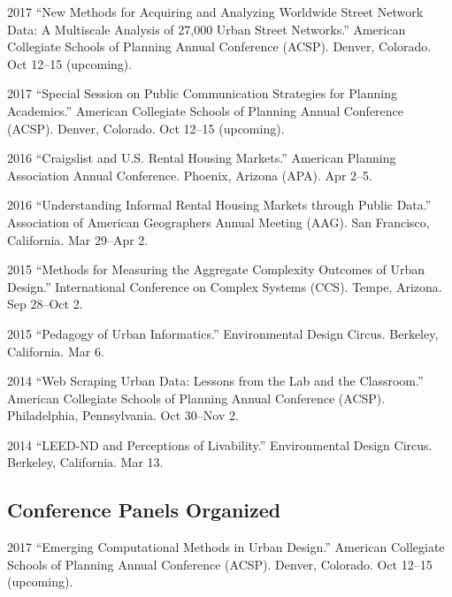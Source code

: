 \documentclass{academiccv}
\begin{document}
\begin{tablist}

\item[2017] \tab \enquote{New Methods for Acquiring and Analyzing Worldwide Street Network Data: A Multiscale Analysis of 27,000 Urban Street Networks.} American Collegiate Schools of Planning Annual Conference (ACSP). Denver, Colorado. Oct 12--15 (upcoming).

\item[2017] \tab \enquote{Special Session on Public Communication Strategies for Planning Academics.} American Collegiate Schools of Planning Annual Conference (ACSP). Denver, Colorado. Oct 12--15 (upcoming).

\item[2016] \tab \enquote{Craigslist and U.S. Rental Housing Markets.} American Planning Association Annual Conference. Phoenix, Arizona (APA). Apr 2--5.

\item[2016] \tab \enquote{Understanding Informal Rental Housing Markets through Public Data.} Association of American Geographers Annual Meeting (AAG). San Francisco, California. Mar 29--Apr 2.

\item[2015] \tab \enquote{Methods for Measuring the Aggregate Complexity Outcomes of Urban Design.} International Conference on Complex Systems (CCS). Tempe, Arizona. Sep 28--Oct 2.

\item[2015] \tab \enquote{Pedagogy of Urban Informatics.} Environmental Design Circus. Berkeley, California. Mar 6.

\item[2014] \tab \enquote{Web Scraping Urban Data: Lessons from the Lab and the Classroom.} American Collegiate Schools of Planning Annual Conference (ACSP). Philadelphia, Pennsylvania. Oct 30--Nov 2.

\item[2014] \tab \enquote{LEED-ND and Perceptions of Livability.} Environmental Design Circus. Berkeley, California. Mar 13.

\end{tablist}



\subsection*{Conference Panels Organized}

\begin{tablist}

\item[2017] \tab \enquote{Emerging Computational Methods in Urban Design.} American Collegiate Schools of Planning Annual Conference (ACSP). Denver, Colorado. Oct 12--15 (upcoming).

\end{tablist}
\end{document}
